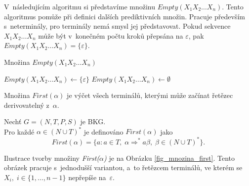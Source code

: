 V~následujícím algoritmu si představíme množinu $Empty(X_1X_2\ldots X_n)$.
Tento algoritmus pomůže při definici dalších prediktivních množin.
Pracuje především s~neterminály, pro terminály nemá smysl jej představovat.
Pokud sekvence $X_1X_2\ldots X_n$ může být v~konečném počtu kroků přepsána na $\varepsilon$, pak $Empty(X_1X_2\ldots X_n) = \{\varepsilon\}$.
\begin{algorithm}[h]
    \caption{Množina $Empty(X_1X_2\ldots X_n)$}
    \label{alg_mnozina_empty_vicn}
    \begin{algorithmic}[1]
        \NewLine
            \State $Empty(X_1X_2\ldots X_n) \gets \{\varepsilon\}$
        \Else
            \State $Empty(X_1X_2\ldots X_n) \gets \emptyset$
        \EndIf
    \end{algorithmic}
\end{algorithm}

Množina $First(\alpha)$ je výčet všech terminálů, kterými může začínat řetězec derivovatelný z~$\alpha$.
\begin{definition}\label{def_mnozina_first}
    Nechť $G = (N, T, P, S)$ je BKG.\\
    Pro každé $\alpha \in (N \cup T)^*$ je definováno $First(\alpha)$ jako
    \begin{equation*}
        First(\alpha) = \{a: a \in T,\; \alpha \Rightarrow^* a\beta,\; \beta \in (N \cup T)^*\}.
    \end{equation*} 
\end{definition}
Ilustrace tvorby množiny \emph{First($\alpha$)} je na Obrázku \ref{fig_mnozina_first}.
Tento obrázek pracuje s~jednodušší variantou, a~to řetězcem terminálů, ve kterém se $X_i,\; i \in \{1, \ldots, n-1\}$ nepřepíše na~$\varepsilon$.

